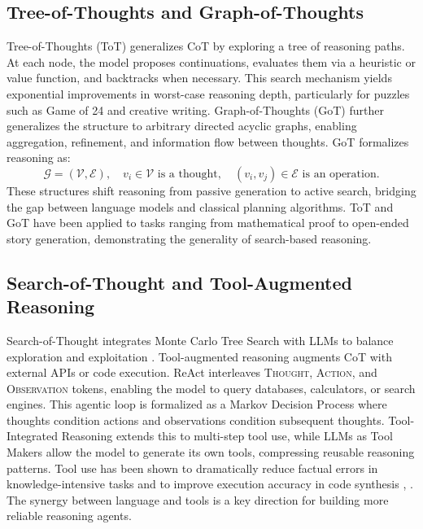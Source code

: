 \documentclass[11pt,a4paper]{article}
\begin{document}
\subsection{Tree-of-Thoughts and Graph-of-Thoughts}
Tree-of-Thoughts (ToT) \citep{yao2023tree} generalizes CoT by exploring a tree of reasoning paths. At each node, the model proposes continuations, evaluates them via a heuristic or value function, and backtracks when necessary. This search mechanism yields exponential improvements in worst-case reasoning depth, particularly for puzzles such as Game of 24 and creative writing. Graph-of-Thoughts (GoT) \citep{besta2024graph} further generalizes the structure to arbitrary directed acyclic graphs, enabling aggregation, refinement, and information flow between thoughts. GoT formalizes reasoning as:
\begin{equation}
\mathcal{G} = (\mathcal{V}, \mathcal{E}), \quad v_i \in \mathcal{V} \text{ is a thought}, \quad (v_i, v_j) \in \mathcal{E} \text{ is an operation}.
\end{equation}
These structures shift reasoning from passive generation to active search, bridging the gap between language models and classical planning algorithms. ToT and GoT have been applied to tasks ranging from mathematical proof to open-ended story generation, demonstrating the generality of search-based reasoning.

\subsection{Search-of-Thought and Tool-Augmented Reasoning}
Search-of-Thought integrates Monte Carlo Tree Search with LLMs to balance exploration and exploitation \citep{yao2023tree}. Tool-augmented reasoning augments CoT with external APIs or code execution. ReAct \citep{yao2023react} interleaves \textsc{Thought}, \textsc{Action}, and \textsc{Observation} tokens, enabling the model to query databases, calculators, or search engines. This agentic loop is formalized as a Markov Decision Process where thoughts condition actions and observations condition subsequent thoughts. Tool-Integrated Reasoning \citep{hao2023tool} extends this to multi-step tool use, while LLMs as Tool Makers \citep{cai2023large} allow the model to generate its own tools, compressing reusable reasoning patterns. Tool use has been shown to dramatically reduce factual errors in knowledge-intensive tasks and to improve execution accuracy in code synthesis \citep{gao2023pal}, \citep{chen2022program}. The synergy between language and tools is a key direction for building more reliable reasoning agents.
\end{document}
